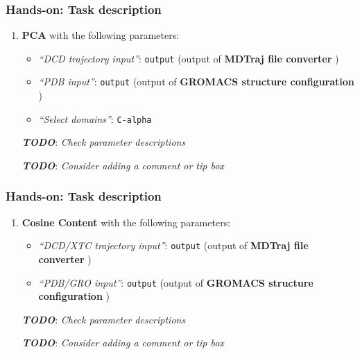 \documentclass[twocolumn]{bmcart}%
\providecommand{\tightlist}{%
  \setlength{\itemsep}{0pt}\setlength{\parskip}{0pt}}
\providecommand{\tightlist}{%
  \setlength{\itemsep}{0pt}\setlength{\parskip}{0pt}}
\begin{document}
\begin{handson_box_colour}

\hypertarget{hands-on-task-description-13}{%
\subsubsection{Hands-on: Task
description}\label{hands-on-task-description-13}}

\begin{enumerate}
\def\labelenumi{\arabic{enumi}.}
\tightlist
\item
  \textbf{PCA} with the following parameters:

  \begin{itemize}
  \tightlist
  \item
    \emph{``DCD trajectory input''}: \texttt{output} (output of
    \textbf{MDTraj file converter} )
  \item
    \emph{``PDB input''}: \texttt{output} (output of \textbf{GROMACS
    structure configuration} )
  \item
    \emph{``Select domains''}: \texttt{C-alpha}
  \end{itemize}

  \textbf{\emph{TODO}}: \emph{Check parameter descriptions}

  \textbf{\emph{TODO}}: \emph{Consider adding a comment or tip box}
\end{enumerate}


\hypertarget{hands-on-task-description-14}{%
\subsubsection{Hands-on: Task
description}\label{hands-on-task-description-14}}

\begin{enumerate}
\def\labelenumi{\arabic{enumi}.}
\tightlist
\item
  \textbf{Cosine Content} with the following parameters:

  \begin{itemize}
  \tightlist
  \item
    \emph{``DCD/XTC trajectory input''}: \texttt{output} (output of
    \textbf{MDTraj file converter} )
  \item
    \emph{``PDB/GRO input''}: \texttt{output} (output of \textbf{GROMACS
    structure configuration} )
  \end{itemize}

  \textbf{\emph{TODO}}: \emph{Check parameter descriptions}

  \textbf{\emph{TODO}}: \emph{Consider adding a comment or tip box}
\end{enumerate}

\end{handson_box_colour}
\end{document}
